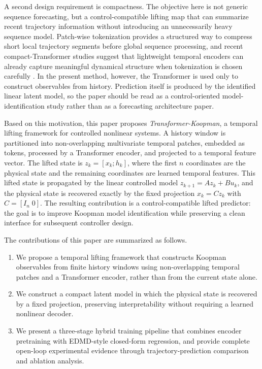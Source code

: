 \documentclass[journal]{IEEEtran}
\begin{document}
A second design requirement is compactness. The objective here is not generic sequence forecasting, but a control-compatible lifting map that can summarize recent trajectory information without introducing an unnecessarily heavy sequence model. Patch-wise tokenization provides a structured way to compress short local trajectory segments before global sequence processing, and recent compact-Transformer studies suggest that lightweight temporal encoders can already capture meaningful dynamical structure when tokenization is chosen carefully \cite{vaswani2017attention, nie2023time, zhou2022fedformer, liu2024itransformer, forootani2026compact, forootani2025synthetic}. In the present method, however, the Transformer is used only to construct observables from history. Prediction itself is produced by the identified linear latent model, so the paper should be read as a control-oriented model-identification study rather than as a forecasting architecture paper.

Based on this motivation, this paper proposes \emph{Transformer-Koopman}, a temporal lifting framework for controlled nonlinear systems. A history window is partitioned into non-overlapping multivariate temporal patches, embedded as tokens, processed by a Transformer encoder, and projected to a temporal feature vector. The lifted state is $z_k=[x_k;h_k]$, where the first $n$ coordinates are the physical state and the remaining coordinates are learned temporal features. This lifted state is propagated by the linear controlled model $z_{k+1}=Az_k+Bu_k$, and the physical state is recovered exactly by the fixed projection $x_k=Cz_k$ with $C=[I_n\;0]$. The resulting contribution is a control-compatible lifted predictor: the goal is to improve Koopman model identification while preserving a clean interface for subsequent controller design.

The contributions of this paper are summarized as follows.
\begin{enumerate}
    \item We propose a temporal lifting framework that constructs Koopman observables from finite history windows using non-overlapping temporal patches and a Transformer encoder, rather than from the current state alone.
    \item We construct a compact latent model in which the physical state is recovered by a fixed projection, preserving interpretability without requiring a learned nonlinear decoder.
    \item We present a three-stage hybrid training pipeline that combines encoder pretraining with EDMD-style closed-form regression, and provide complete open-loop experimental evidence through trajectory-prediction comparison and ablation analysis.
\end{enumerate}
\end{document}
